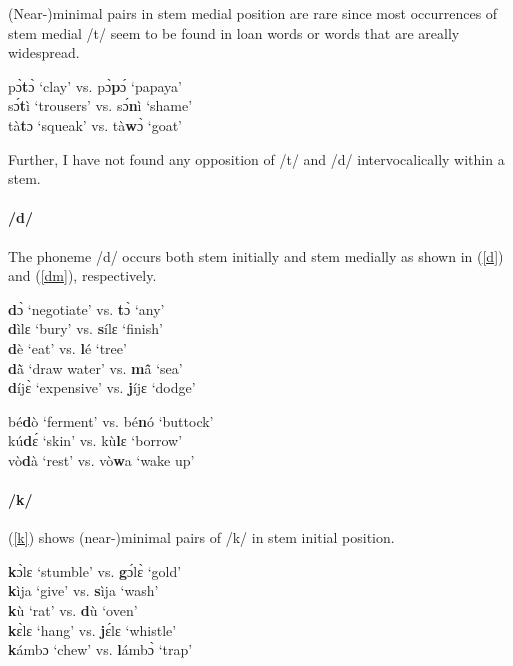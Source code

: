 \noindent (Near-)minimal pairs in stem medial position are rare since most occurrences of stem medial /t/ seem to be found in loan words or words that are areally widespread. 

\begin{exe} \ex \label{tm}
pɔ̀{\bfseries t}ɔ̀ `clay' vs. pɔ̀{\bfseries p}ɔ́ `papaya' \\
sɔ́{\bfseries t}ì `trousers' vs. sɔ́{\bfseries n}ì `shame' \\
tà{\bfseries t}ɔ `squeak' vs. tà{\bfseries w}ɔ̀ `goat'
\end{exe}

\noindent Further, I have not found any opposition of /t/ and /d/ intervocalically within a stem.

\paragraph{\bfseries /d/} The phoneme /d/ occurs both stem initially and stem medially as shown in (\ref{d}) and (\ref{dm}), respectively.

\begin{exe} \ex \label{d}
{\bfseries d}ɔ̀ `negotiate' vs. {\bfseries t}ɔ̀ `any' \\
{\bfseries d}ìlɛ `bury' vs. {\bfseries s}ílɛ `finish' \\
{\bfseries d}è `eat' vs. {\bfseries l}é `tree' \\
{\bfseries d}ã̀ `draw water' vs. {\bfseries m}ã̂ `sea' \\
{\bfseries d}íjɛ̀ `expensive' vs. {\bfseries j}íjɛ `dodge'
\end{exe}


\begin{exe} \ex \label{dm}
bé{\bfseries d}ò `ferment' vs. bé{\bfseries n}ó `buttock' \\
kú{\bfseries d}ɛ́ `skin' vs. kù{\bfseries l}ɛ `borrow' \\
vò{\bfseries d}à `rest' vs. vò{\bfseries w}a `wake up'
\end{exe}


\paragraph{\bfseries /k/} (\ref{k}) shows (near-)minimal pairs of /k/ in stem initial position.

\begin{exe} \ex \label{k}
{\bfseries k}ɔ̀lɛ `stumble' vs. {\bfseries g}ɔ́lɛ̀ `gold' \\
{\bfseries k}ìja `give' vs. {\bfseries s}ìja `wash' \\
{\bfseries k}ù `rat' vs. {\bfseries d}ù `oven' \\
{\bfseries k}ɛ̀lɛ `hang' vs. {\bfseries j}ɛ́lɛ `whistle'  \\
{\bfseries k}ámbɔ `chew' vs. {\bfseries l}ámbɔ̀ `trap'
\end{exe}

